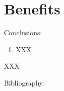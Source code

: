 \section{Benefits}

 \begin{frame}[c]{Conclusions:}
 
     \begin{enumerate}
    \item XXX

\end{enumerate}

XXX
 \end{frame}
 
 
 
 
\begin{frame}[c]{Bibliography:}
 



\end{frame}
